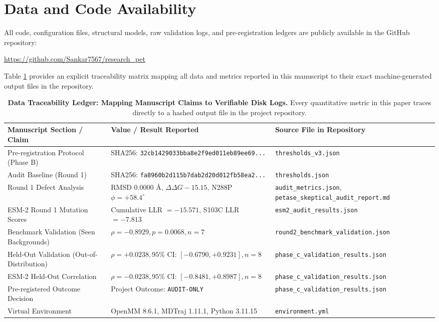 \documentclass[10pt,twocolumn]{article}
\begin{document}
\section{Data and Code Availability}

All code, configuration files, structural models, raw validation logs, and pre-registration ledgers are publicly available in the GitHub repository:
\begin{center}
\url{https://github.com/Sankar7567/research_pet}
\end{center}
Table \ref{tab:traceability} provides an explicit traceability matrix mapping all data and metrics reported in this manuscript to their exact machine-generated output files in the repository.

\begin{table}[t]
\centering
\small
\caption{\textbf{Data Traceability Ledger: Mapping Manuscript Claims to Verifiable Disk Logs.} Every quantitative metric in this paper traces directly to a hashed output file in the project repository.}
\label{tab:traceability}
\begin{tabularx}{\textwidth}{llX}
\toprule
\textbf{Manuscript Section / Claim} & \textbf{Value / Result Reported} & \textbf{Source File in Repository} \\
\midrule
Pre-registration Protocol (Phase B) & SHA256: \texttt{32cb1429033bba8e2f9ed011eb89ee69...} & \texttt{thresholds\_v3.json} \\
Audit Baseline (Round 1) & SHA256: \texttt{fa8960b2d115b7dab2d20d012fb58ea2...} & \texttt{thresholds.json} \\
Round 1 Defect Analysis & RMSD $0.0000\text{ \AA}$, $\Delta\Delta G -15.15$, N288P $\phi = +58.4^\circ$ & \texttt{audit\_metrics.json}, \texttt{petase\_skeptical\_audit\_report.md} \\
ESM-2 Round 1 Mutation Scores & Cumulative LLR $= -15.571$, S103C LLR $= -7.813$ & \texttt{esm2\_audit\_results.json} \\
Benchmark Validation (Seen Backgrounds) & $\rho = -0.8929, p = 0.0068, n = 7$ & \texttt{round2\_benchmark\_validation.json} \\
Held-Out Validation (Out-of-Distribution) & $\rho = +0.0238, 95\%\text{ CI: } [-0.6790, +0.9231], n = 8$ & \texttt{phase\_c\_validation\_results.json} \\
ESM-2 Held-Out Correlation & $\rho = -0.0238, 95\%\text{ CI: } [-0.8481, +0.8987], n = 8$ & \texttt{phase\_c\_validation\_results.json} \\
Pre-registered Outcome Decision & Project Outcome: \texttt{AUDIT-ONLY} & \texttt{phase\_c\_validation\_results.json} \\
Virtual Environment & OpenMM 8.6.1, MDTraj 1.11.1, Python 3.11.15 & \texttt{environment.yml} \\
\bottomrule
\end{tabularx}
\end{table}
\end{document}
